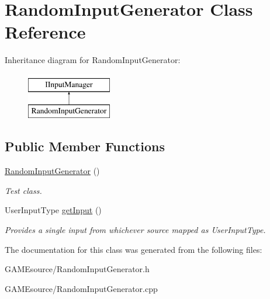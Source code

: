 \hypertarget{class_random_input_generator}{}\section{Random\+Input\+Generator Class Reference}
\label{class_random_input_generator}
Inheritance diagram for Random\+Input\+Generator\+:\begin{figure}[H]
\begin{center}
\leavevmode
\includegraphics[height=2.000000cm]{class_random_input_generator}
\end{center}
\end{figure}
\subsection*{Public Member Functions}
\begin{DoxyCompactItemize}
\item 
\mbox{\label{class_random_input_generator_afd6c995d37855154f296050304307ee4}} 
\mbox{\hyperlink{class_random_input_generator_afd6c995d37855154f296050304307ee4}{Random\+Input\+Generator}} ()
\begin{DoxyCompactList}\small\item\em Test class. \end{DoxyCompactList}\item 
\mbox{\label{class_random_input_generator_a519c2556c497b6b5ab521334d39749d9}} 
User\+Input\+Type \mbox{\hyperlink{class_random_input_generator_a519c2556c497b6b5ab521334d39749d9}{get\+Input}} ()
\begin{DoxyCompactList}\small\item\em Provides a single input from whichever source mapped as User\+Input\+Type. \end{DoxyCompactList}\end{DoxyCompactItemize}


The documentation for this class was generated from the following files\+:\begin{DoxyCompactItemize}
\item 
G\+A\+M\+Esource/Random\+Input\+Generator.\+h\item 
G\+A\+M\+Esource/Random\+Input\+Generator.\+cpp\end{DoxyCompactItemize}
